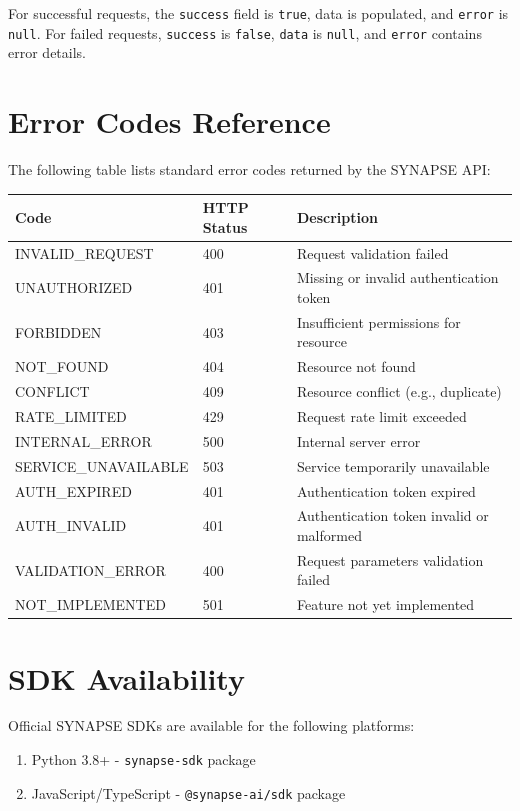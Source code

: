 \documentclass{report}
\begin{document}
For successful requests, the \texttt{success} field is \texttt{true}, data is populated, and \texttt{error} is \texttt{null}. For failed requests, \texttt{success} is \texttt{false}, \texttt{data} is \texttt{null}, and \texttt{error} contains error details.

\section{Error Codes Reference}

The following table lists standard error codes returned by the SYNAPSE API:

\begin{center}
\begin{tabular}{llp{4cm}}
\toprule
\textbf{Code} & \textbf{HTTP Status} & \textbf{Description} \\
\midrule
INVALID\_REQUEST & 400 & Request validation failed \\
UNAUTHORIZED & 401 & Missing or invalid authentication token \\
FORBIDDEN & 403 & Insufficient permissions for resource \\
NOT\_FOUND & 404 & Resource not found \\
CONFLICT & 409 & Resource conflict (e.g., duplicate) \\
RATE\_LIMITED & 429 & Request rate limit exceeded \\
INTERNAL\_ERROR & 500 & Internal server error \\
SERVICE\_UNAVAILABLE & 503 & Service temporarily unavailable \\
AUTH\_EXPIRED & 401 & Authentication token expired \\
AUTH\_INVALID & 401 & Authentication token invalid or malformed \\
VALIDATION\_ERROR & 400 & Request parameters validation failed \\
NOT\_IMPLEMENTED & 501 & Feature not yet implemented \\
\bottomrule
\end{tabular}
\end{center}

\section{SDK Availability}

Official SYNAPSE SDKs are available for the following platforms:

\begin{enumerate}
    \item Python 3.8+ - \texttt{synapse-sdk} package
    \item JavaScript/TypeScript - \texttt{@synapse-ai/sdk} package
\end{enumerate}
\end{document}
